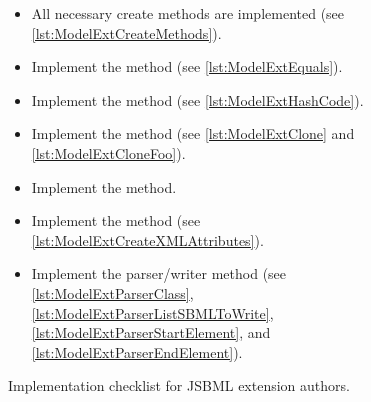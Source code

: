 \begin{figure}[htb]
\begin{framed}
\begin{itemize}[label=$\Box$,leftmargin=2em]
\begin{itemize}[label=$\Box$]
      \item {}
        
      \item {}
        
      \item {}
        
      \item {}

      \end{itemize}

    \item All necessary create methods are implemented (see 
      \vref{lst:ModelExtCreateMethods}).

    \item Implement the  method (see 
      \vref{lst:ModelExtEquals}).

    \item Implement the  method (see 
      \vref{lst:ModelExtHashCode}).

    \item Implement the  method (see 
      \vref{lst:ModelExtClone} and \vref{lst:ModelExtCloneFoo}).

    \item Implement the  method.

    \item Implement the  method (see 
      \vref{lst:ModelExtCreateXMLAttributes}).

    \item Implement the parser/writer method (see 
      \vref{lst:ModelExtParserClass},
      \vref{lst:ModelExtParserListSBMLToWrite},
      \vref{lst:ModelExtParserStartElement}, and
      \vref{lst:ModelExtParserEndElement}).
    \end{itemize}
  \end{framed}
  \caption{Implementation checklist for JSBML extension authors.}
  \label{fig:checklist}
\end{figure}
